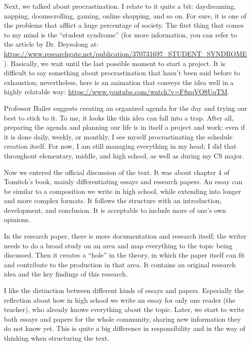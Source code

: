 Next, we talked about procrastination. I relate to it quite a bit: daydreaming, napping, doomscrolling, gaming, online shopping, and so on. For sure, it is one of the problems that afflict a huge percentage of society. The first thing that comes to my mind is the ``student syndrome'' (for more information, you can refer to the article by Dr. Deysolong at: \url{https://www.researchgate.net/publication/370731697_STUDENT_SYNDROME}). Basically, we wait until the last possible moment to start a project. It is difficult to say something about procrastination that hasn't been said before to exhaustion; nevertheless, here is an animation that conveys the idea well in a highly relatable way: \url{https://www.youtube.com/watch?v=F8zqVO8UqTM}.

Professor Bailer suggests creating an organized agenda for the day and trying our best to stick to it. To me, it looks like this idea can fall into a trap. After all, preparing the agenda and planning our life is in itself a project and work; even if it is done daily, weekly, or monthly, I see myself procrastinating the schedule creation itself. For now, I am still managing everything in my head; I did that throughout elementary, middle, and high school, as well as during my CS major.

Now we entered the official discussion of the text. It was about chapter 4 of Tomitch's book, mainly differentiating essays and research papers. An essay can be similar to a composition we write in high school, while extending into longer and more complex formats. It follows the structure with an introduction, development, and conclusion. It is acceptable to include more of one's own opinions.

In the research paper, there is more documentation and research itself; the writer needs to do a broad study on an area and map everything to the topic being discussed. Then it creates a ``hole'' in the theory, in which the paper itself can fit and contribute to the production in that area. It contains an original research idea and the key findings of this research.

I like the distinction between different kinds of essays and papers. Especially the reflection about how in high school we write an essay for only one reader (the teacher), who already knows everything about the topic. Later, we start to write both essays and papers for the whole community, sharing new information they do not know yet. This is quite a big difference in responsibility and in the way of thinking when structuring the text.

